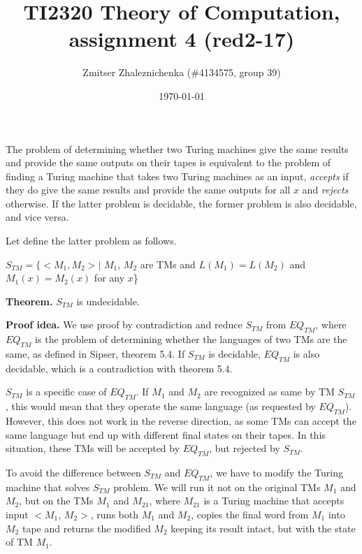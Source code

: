 \documentclass[a4paper, notitlepage]{article}
\begin{document}
\makeatletter
\renewcommand\paragraph{\@startsection{paragraph}{4}{\z@}%
  {-3.25ex\@plus -1ex \@minus -.2ex}%
  {1.5ex \@plus .2ex}%
  {\normalfont\normalsize\bfseries}}
\makeatother

\title{TI2320 Theory of Computation, assignment 4 (red2-17)} 
\author{Zmitser Zhaleznichenka (\#4134575, group 39)}
\date{\today}
\maketitle

\setcounter{secnumdepth}{0}

The problem of determining whether two Turing machines give the same results and provide the same outputs on their tapes is equivalent to the problem of finding a Turing machine that takes two Turing machines as an input, \emph{accepts} if they do give the same results and provide the same outputs for all $x$ and \emph{rejects} otherwise. If the latter problem is decidable, the former problem is also decidable, and vice versa.

Let define the latter problem as follows. 

\begin{center} 
$S_{TM} = \{<M_1, M_2> |$ $M_1$, $M_2$ are TMs and $L(M_1) = L(M_2)$ and $M_1(x) = M_2(x)$ for any $x$\}
\end{center}

\textbf{Theorem.} $S_{TM}$ is undecidable.\newline

\textbf{Proof idea.} We use proof by contradiction and reduce $S_{TM}$ from $EQ_{TM}$, where $EQ_{TM}$ is the problem of determining whether the languages of two TMs are the same, as defined in Sipser, theorem 5.4. If $S_{TM}$ is decidable, $EQ_{TM}$ is also decidable, which is a contradiction with theorem 5.4. 

$S_{TM}$ is a specific case of $EQ_{TM}$. If $M_1$ and $M_2$ are recognized as same by TM $S_{TM}$, this would mean that they operate the same language (as requested by $EQ_{TM}$). However, this does not work in the reverse direction, as some TMs can accept the same language but end up with different final states on their tapes. In this situation, these TMs will be accepted by $EQ_{TM}$, but rejected by $S_{TM}$. 

To avoid the difference between $S_{TM}$ and $EQ_{TM}$, we have to modify the Turing machine that  solves $S_{TM}$ problem. We will run it not on the original TMs $M_1$ and $M_2$, but on the TMs $M_1$ and $M_{21}$, where $M_{21}$ is a Turing machine that accepts input $<M_1$, $M_2>$, runs both $M_1$ and $M_2$, copies the final word from $M_1$ into $M_2$ tape and returns the modified $M_2$ keeping its result intact, but with the state of TM $M_1$.\newline
\end{document}
